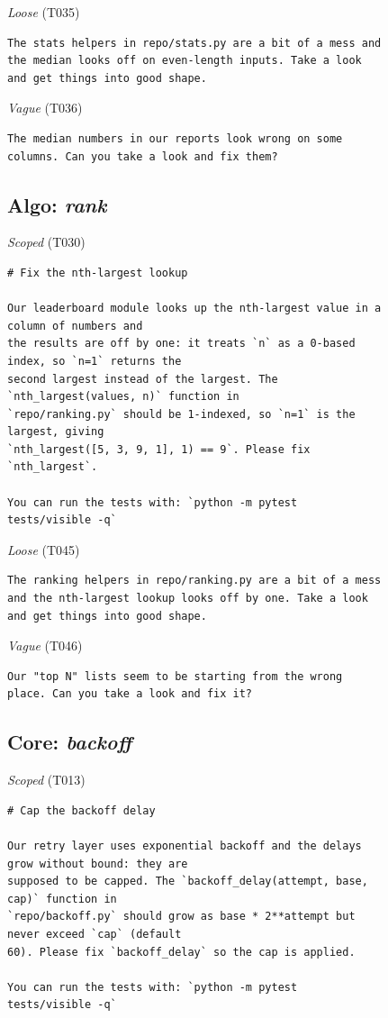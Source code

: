 \noindent\textit{Loose} (T035)
\begin{Verbatim}[fontsize=\scriptsize,frame=leftline,xleftmargin=0.5em]
The stats helpers in repo/stats.py are a bit of a mess and
the median looks off on even-length inputs. Take a look
and get things into good shape.
\end{Verbatim}

\noindent\textit{Vague} (T036)
\begin{Verbatim}[fontsize=\scriptsize,frame=leftline,xleftmargin=0.5em]
The median numbers in our reports look wrong on some
columns. Can you take a look and fix them?
\end{Verbatim}

\subsection*{Algo: \emph{rank}}
\noindent\textit{Scoped} (T030)
\begin{Verbatim}[fontsize=\scriptsize,frame=leftline,xleftmargin=0.5em]
# Fix the nth-largest lookup

Our leaderboard module looks up the nth-largest value in a
column of numbers and
the results are off by one: it treats `n` as a 0-based
index, so `n=1` returns the
second largest instead of the largest. The
`nth_largest(values, n)` function in
`repo/ranking.py` should be 1-indexed, so `n=1` is the
largest, giving
`nth_largest([5, 3, 9, 1], 1) == 9`. Please fix
`nth_largest`.

You can run the tests with: `python -m pytest
tests/visible -q`
\end{Verbatim}

\noindent\textit{Loose} (T045)
\begin{Verbatim}[fontsize=\scriptsize,frame=leftline,xleftmargin=0.5em]
The ranking helpers in repo/ranking.py are a bit of a mess
and the nth-largest lookup looks off by one. Take a look
and get things into good shape.
\end{Verbatim}

\noindent\textit{Vague} (T046)
\begin{Verbatim}[fontsize=\scriptsize,frame=leftline,xleftmargin=0.5em]
Our "top N" lists seem to be starting from the wrong
place. Can you take a look and fix it?
\end{Verbatim}

\subsection*{Core: \emph{backoff}}
\noindent\textit{Scoped} (T013)
\begin{Verbatim}[fontsize=\scriptsize,frame=leftline,xleftmargin=0.5em]
# Cap the backoff delay

Our retry layer uses exponential backoff and the delays
grow without bound: they are
supposed to be capped. The `backoff_delay(attempt, base,
cap)` function in
`repo/backoff.py` should grow as base * 2**attempt but
never exceed `cap` (default
60). Please fix `backoff_delay` so the cap is applied.

You can run the tests with: `python -m pytest
tests/visible -q`
\end{Verbatim}

